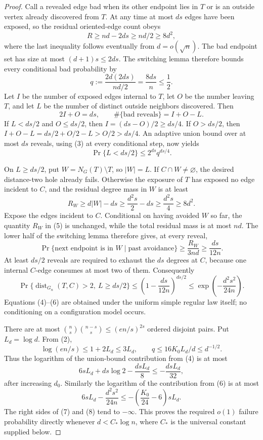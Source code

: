 \documentclass{article}
\begin{document}
\begin{proof}
Call a revealed edge bad when its other endpoint lies in \(T\) or is an outside vertex already discovered from \(T\).  At any time at most \(ds\) edges have been exposed, so the residual oriented-edge count obeys
\[
R\ge nd-2ds\ge nd/2\ge8d^2,
\]
where the last inequality follows eventually from \(d=o(\sqrt n)\).  The bad endpoint set has size at most \((d+1)s\le2ds\).  The switching lemma therefore bounds every conditional bad probability by
\[
q:=\frac{2d(2ds)}{nd/2}=\frac{8ds}{n}\le\frac12.
\tag{3}
\]
Let \(I\) be the number of exposed edges internal to \(T\), let \(O\) be the number leaving \(T\), and let \(L\) be the number of distinct outside neighbors discovered.  Then
\[
2I+O=ds,
\qquad
\#\{\text{bad reveals}\}=I+O-L.
\]
If \(L<ds/2\) and \(O\le ds/2\), then \(I=(ds-O)/2\ge ds/4\).  If \(O>ds/2\), then \(I+O-L=ds/2+O/2-L>O/2>ds/4\).  An adaptive union bound over at most \(ds\) reveals, using (3) at every conditional step, now yields
\[
\Pr\{L<ds/2\}
\le 2^{ds}q^{ds/4}.
\tag{4}
\]

On \(L\ge ds/2\), put \(W=N_G(T)\setminus T\), so \(|W|=L\).  If \(C\cap W\ne\varnothing\), the desired distance-two hole already fails.  Otherwise the exposure of \(T\) has exposed no edge incident to \(C\), and the residual degree mass in \(W\) is at least
\[
R_W\ge d|W|-ds\ge\frac{d^2s}{2}-ds\ge\frac{d^2s}{4}\ge8d^2.
\tag{5}
\]
Expose the edges incident to \(C\).  Conditional on having avoided \(W\) so far, the quantity \(R_W\) in (5) is unchanged, while the total residual mass is at most \(nd\).  The lower half of the switching lemma therefore gives, at every reveal,
\[
\Pr\{\text{next endpoint is in }W\mid\text{past avoidance}\}
\ge\frac{R_W}{3nd}\ge\frac{ds}{12n}.
\]
At least \(ds/2\) reveals are required to exhaust the \(ds\) degrees at \(C\), because one internal \(C\)-edge consumes at most two of them.  Consequently
\[
\Pr\{\operatorname{dist}_{G_n}(T,C)>2,\ L\ge ds/2\}
\le\left(1-\frac{ds}{12n}\right)^{ds/2}
\le\exp\!\left(-\frac{d^2s^2}{24n}\right).
\tag{6}
\]
Equations (4)--(6) are obtained under the uniform simple regular law itself; no conditioning on a configuration model occurs.

There are at most \(\binom ns\binom{n-s}s\le(en/s)^{2s}\) ordered disjoint pairs.  Put \(L_d=\log d\).  From (2),
\[
\log(en/s)\le1+2L_d\le3L_d,
\qquad
q\le16K_0L_d/d\le d^{-1/2}.
\]
Thus the logarithm of the union-bound contribution from (4) is at most
\[
6sL_d+ds\log2-\frac{dsL_d}{8}
\le-\frac{dsL_d}{32},
\tag{7}
\]
after increasing \(d_0\).  Similarly the logarithm of the contribution from (6) is at most
\[
6sL_d-\frac{d^2s^2}{24n}
\le-\left(\frac{K_0}{24}-6\right)sL_d.
\tag{8}
\]
The right sides of (7) and (8) tend to \(-\infty\).  This proves the required \(o(1)\) failure probability directly whenever \(d<C_*\log n\), where \(C_*\) is the universal constant supplied below.


\end{proof}
\end{document}
